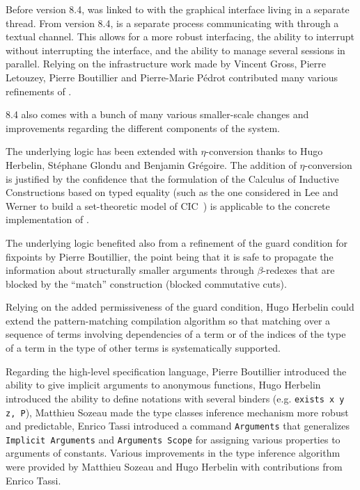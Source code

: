 Before version 8.4, {\CoqIDE} was linked to {\Coq} with the graphical
interface living in a separate thread. From version 8.4, {\CoqIDE} is a
separate process communicating with {\Coq} through a textual
channel. This allows for a more robust interfacing, the ability to
interrupt {\Coq} without interrupting the interface, and the ability to
manage several sessions in parallel. Relying on the infrastructure
work made by Vincent Gross, Pierre Letouzey, Pierre Boutillier and
Pierre-Marie P\'edrot contributed many various refinements of {\CoqIDE}.

{\Coq} 8.4 also comes with a bunch of many various smaller-scale changes
and improvements regarding the different components of the system.

The underlying logic has been extended with $\eta$-conversion thanks
to Hugo Herbelin, St\'ephane Glondu and Benjamin Gr\'egoire. The
addition of $\eta$-conversion is justified by the confidence that the
formulation of the Calculus of Inductive Constructions based on typed
equality (such as the one considered in Lee and Werner to build a
set-theoretic model of CIC~\cite{LeeWerner11}) is applicable to the
concrete implementation of {\Coq}.

The underlying logic benefited also from a refinement of the guard
condition for fixpoints by Pierre Boutillier, the point being that it
is safe to propagate the information about structurally smaller
arguments through $\beta$-redexes that are blocked by the
``match'' construction (blocked commutative cuts).

Relying on the added permissiveness of the guard condition, Hugo
Herbelin could extend the pattern-matching compilation algorithm
so that matching over a sequence of terms involving
dependencies of a term or of the indices of the type of a term in the
type of other terms is systematically supported.

Regarding the high-level specification language, Pierre Boutillier
introduced the ability to give implicit arguments to anonymous
functions, Hugo Herbelin introduced the ability to define notations
with several binders (e.g. \verb=exists x y z, P=), Matthieu Sozeau
made the type classes inference mechanism more robust and predictable,
Enrico Tassi introduced a command {\tt Arguments} that generalizes
{\tt Implicit Arguments} and {\tt Arguments Scope} for assigning
various properties to arguments of constants. Various improvements in
the type inference algorithm were provided by Matthieu Sozeau and Hugo
Herbelin with contributions from Enrico Tassi.

